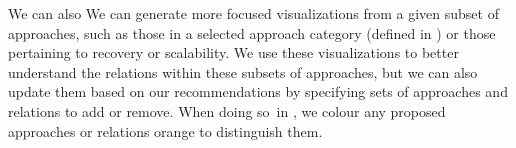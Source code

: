     We can also \else We can \fi generate more focused visualizations from a
given subset of approaches, such as \ifnotpaper\else those in a selected
    approach category (defined in ) or \fi those pertaining to
recovery or scalability\ifnotpaper.
We use these visualizations to better understand the relations within these
subsets of approaches, but we can also update them based on
our recommendations by specifying sets of approaches and relations to add or
remove. %
When doing so\ifnotpaper\ in \fi, we colour any proposed approaches
or relations orange to distinguish them.


\else
\fi
